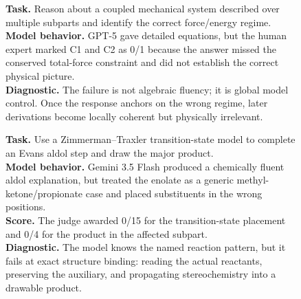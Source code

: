 \documentclass[11pt]{article}
\begin{document}
\begin{figure}[t]
\centering
\begin{tcolorbox}[
  title={Case A: Global physical invariant missed after fluent local reasoning (IPhO 2025 S2 C1--C2)},
  colback=gray!3,
  colframe=black!35,
  boxrule=0.6pt,
  arc=1.5mm,
  left=1.5mm,right=1.5mm,top=1mm,bottom=1mm
]
\footnotesize
\textbf{Task.} Reason about a coupled mechanical system described over multiple subparts and identify the correct force/energy regime.\\
\textbf{Model behavior.} GPT-5 gave detailed equations, but the human expert marked C1 and C2 as 0/1 because the answer missed the conserved total-force constraint and did not establish the correct physical picture.\\
\textbf{Diagnostic.} The failure is not algebraic fluency; it is global model control. Once the response anchors on the wrong regime, later derivations become locally coherent but physically irrelevant.
\end{tcolorbox}

\vspace{-0.5em}

\begin{tcolorbox}[
  title={Case B: Stereochemical template applied to the wrong substrate (IChO 2025 Q2.2a--b)},
  colback=gray!3,
  colframe=black!35,
  boxrule=0.6pt,
  arc=1.5mm,
  left=1.5mm,right=1.5mm,top=1mm,bottom=1mm
]
\footnotesize
\textbf{Task.} Use a Zimmerman--Traxler transition-state model to complete an Evans aldol step and draw the major product.\\
\textbf{Model behavior.} Gemini 3.5 Flash produced a chemically fluent aldol explanation, but treated the enolate as a generic methyl-ketone/propionate case and placed substituents in the wrong positions.\\
\textbf{Score.} The judge awarded 0/15 for the transition-state placement and 0/4 for the product in the affected subpart.\\
\textbf{Diagnostic.} The model knows the named reaction pattern, but it fails at exact structure binding: reading the actual reactants, preserving the auxiliary, and propagating stereochemistry into a drawable product.
\end{tcolorbox}

\vspace{-0.5em}


\end{figure}
\end{document}
